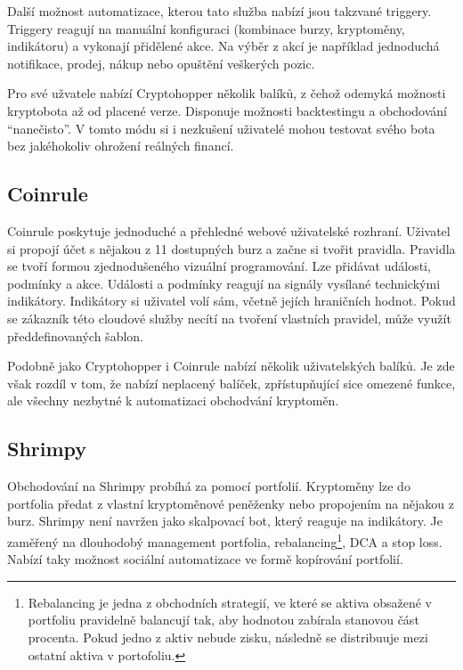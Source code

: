 Další možnost automatizace, kterou tato služba nabízí jsou takzvané triggery. Triggery reagují na manuální konfiguraci (kombinace burzy, kryptoměny, indikátoru) a vykonají
přidělené akce. Na výběr z akcí je například jednoduchá notifikace, prodej, nákup nebo opuštění veškerých pozic.

Pro své užvatele nabízí Cryptohopper několik balíků, z čehož odemyká možnosti kryptobota až od placené verze. Disponuje možnosti backtestingu a obchodování \enquote{nanečisto}.
V tomto módu si i nezkušení uživatelé mohou testovat svého bota bez jakéhokoliv ohrožení reálných financí.

\subsection{Coinrule}
Coinrule poskytuje jednoduché a přehledné webové uživatelské rozhraní. Uživatel si propojí účet s nějakou z 11 dostupných burz a začne si tvořit pravidla. Pravidla se tvoří
formou zjednodušeného vizuální programování. Lze přidávat události, podmínky a akce. Události a podmínky reagují na signály vysílané technickými indikátory. Indikátory
si uživatel volí sám, včetně jejích hraničních hodnot. Pokud se zákazník této cloudové služby necítí na tvoření vlastních pravidel, může využít předdefinovaných šablon.

Podobně jako Cryptohopper i Coinrule nabízí několik uživatelských balíků. Je zde však rozdíl v tom, že nabízí neplacený balíček, zpřístupňující sice omezené funkce, ale
všechny nezbytné k automatizaci obchodvání kryptoměn.


\subsection{Shrimpy}
Obchodování na Shrimpy probíhá za pomocí portfolií. Kryptoměny lze do portfolia předat z vlastní kryptoměnové peněženky nebo propojením na nějakou z burz. Shrimpy není navržen jako
skalpovací bot, který reaguje na indikátory. Je zaměřený na dlouhodobý management portfolia, rebalancing\footnote{Rebalancing je jedna z obchodních strategií, ve které
    se aktiva obsažené v portfoliu pravidelně balancují tak, aby hodnotou zabírala stanovou část procenta. Pokud jedno z aktiv nebude zisku, následně se distribuuje mezi ostatní
    aktiva v portofoliu.},
DCA a stop loss. Nabízí taky možnost sociální automatizace ve formě kopírování portfolií.


\endinput